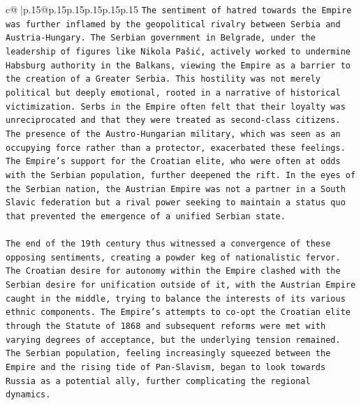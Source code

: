 \documentclass{article}
\begin{document}
{\begin{supertabular}{c@{$\;$}|p{.15\linewidth}@{}p{.15\linewidth}p{.15\linewidth}p{.15\linewidth}p{.15\linewidth}p{.15\linewidth}}
{{{\texttt{The sentiment of hatred towards the Empire was further inflamed by the geopolitical rivalry between Serbia and Austria{-}Hungary. The Serbian government in Belgrade, under the leadership of figures like Nikola Pašić, actively worked to undermine Habsburg authority in the Balkans, viewing the Empire as a barrier to the creation of a Greater Serbia. This hostility was not merely political but deeply emotional, rooted in a narrative of historical victimization. Serbs in the Empire often felt that their loyalty was unreciprocated and that they were treated as second{-}class citizens. The presence of the Austro{-}Hungarian military, which was seen as an occupying force rather than a protector, exacerbated these feelings. The Empire's support for the Croatian elite, who were often at odds with the Serbian population, further deepened the rift. In the eyes of the Serbian nation, the Austrian Empire was not a partner in a South Slavic federation but a rival power seeking to maintain a status quo that prevented the emergence of a unified Serbian state.} \\
\\ 
\texttt{The end of the 19th century thus witnessed a convergence of these opposing sentiments, creating a powder keg of nationalistic fervor. The Croatian desire for autonomy within the Empire clashed with the Serbian desire for unification outside of it, with the Austrian Empire caught in the middle, trying to balance the interests of its various ethnic components. The Empire's attempts to co{-}opt the Croatian elite through the Statute of 1868 and subsequent reforms were met with varying degrees of acceptance, but the underlying tension remained. The Serbian population, feeling increasingly squeezed between the Empire and the rising tide of Pan{-}Slavism, began to look towards Russia as a potential ally, further complicating the regional dynamics.} \\
\\ 
}}}
\end{supertabular}}
\end{document}
